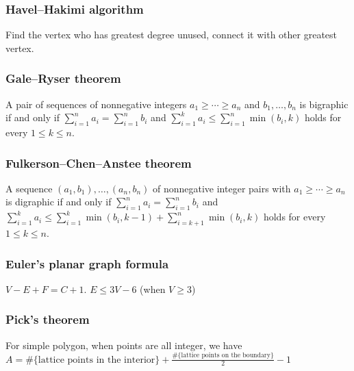 \subsubsection{Havel–Hakimi algorithm}
Find the vertex who has greatest degree unused, connect it with other greatest vertex.

\subsubsection{Gale–Ryser theorem}
A pair of sequences of nonnegative integers $a_1\ge\cdots\ge a_n$ and $b_1,\ldots,b_n$ is bigraphic if and only if $\sum_{i=1}^n a_i=\sum_{i=1}^n b_i$ and $\sum_{i=1}^k a_i\le \sum_{i=1}^n\min(b_i,k)$ holds for every $1\le k\le n$.

\subsubsection{Fulkerson–Chen–Anstee theorem}
A sequence $(a_1,b_1),\ldots,(a_n,b_n)$ of nonnegative integer pairs with $a_1\ge\cdots\ge a_n$ is digraphic if and only if $\sum_{i=1}^n a_i=\sum_{i=1}^n b_i$ and $\sum_{i=1}^k a_i\le \sum_{i=1}^k\min(b_i,k-1)+\sum_{i=k+1}^n\min(b_i,k)$ holds for every $1\le k\le n$.


\subsubsection{Euler's planar graph formula}
$V-E+F=C+1$. $E\leq 3V-6$ (when $V\geq 3$)

\subsubsection{Pick's theorem}
For simple polygon, when points are all integer, we have $A=\text{\#\{lattice points in the interior\}} + \frac{\text{\#\{lattice points on the boundary\}}}{2} - 1$


